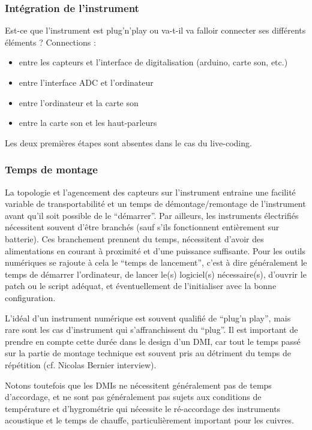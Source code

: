 \subsubsection{Intégration de l'instrument}

Est-ce que l'instrument est plug'n'play ou va-t-il va falloir connecter ses différents éléments ? Connections : 
\vspace{-1em}
\begin{itemize}[noitemsep]
	\item entre les capteurs et l'interface de digitalisation (arduino, carte son, etc.)
	\item entre l'interface ADC et l'ordinateur
	\item entre l'ordinateur et la carte son
	\item entre la carte son et les haut-parleurs
\end{itemize}

Les deux premières étapes sont absentes dans le cas du live-coding.


\subsubsection{Temps de montage}

La topologie et l'agencement des capteurs sur l'instrument entraine une facilité variable de transportabilité et un temps de démontage/remontage de l'instrument avant qu'il soit possible de le ``démarrer''.
Par ailleurs, les instruments électrifiés nécessitent souvent d'être branchés (sauf s'ils fonctionnent entièrement sur batterie). Ces branchement prennent du temps, nécessitent d'avoir des alimentations en courant à proximité et d'une puissance suffisante. Pour les outils numériques se rajoute à cela le ``temps de lancement'', c'est à dire généralement le temps de démarrer l'ordinateur, de lancer le(s) logiciel(s) nécessaire(s), d'ouvrir le patch ou le script adéquat, et éventuellement de l'initialiser avec la bonne configuration.

L'idéal d'un instrument numérique est souvent qualifié de ``plug'n play'', mais rare sont les cas d'instrument qui s'affranchissent du ``plug''. Il est important de prendre en compte cette durée dans le design d'un DMI, car tout le temps passé sur la partie de montage technique est souvent pris au détriment du temps de répétition (cf. Nicolas Bernier interview). 

Notons toutefois que les DMIs ne nécessitent généralement pas de temps d'accordage, et ne sont pas généralement pas sujets aux conditions de température et d'hygrométrie qui nécessite le ré-accordage des instruments acoustique et le temps de chauffe, particulièrement important pour les cuivres.



